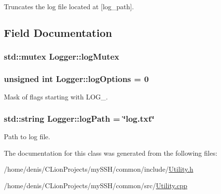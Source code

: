 Truncates the log file located at \mbox{[}log\+\_\+path\mbox{]}. 



\subsection{Field Documentation}
\subsubsection[{\texorpdfstring{log\+Mutex}{logMutex}}]{\setlength{\rightskip}{0pt plus 5cm}std\+::mutex Logger\+::log\+Mutex\hspace{0.3cm}{\ttfamily [static]}}\hypertarget{classLogger_a1a7f5dc4185f8bff7778f1d6aa8525a9}{}\label{classLogger_a1a7f5dc4185f8bff7778f1d6aa8525a9}
\subsubsection[{\texorpdfstring{log\+Options}{logOptions}}]{\setlength{\rightskip}{0pt plus 5cm}unsigned int Logger\+::log\+Options = 0\hspace{0.3cm}{\ttfamily [static]}}\hypertarget{classLogger_a60d0eaf4eece8b505c52c6302048a9c1}{}\label{classLogger_a60d0eaf4eece8b505c52c6302048a9c1}


Mask of flags starting with L\+O\+G\+\_\+. 

\subsubsection[{\texorpdfstring{log\+Path}{logPath}}]{\setlength{\rightskip}{0pt plus 5cm}std\+::string Logger\+::log\+Path = \char`\"{}log.\+txt\char`\"{}\hspace{0.3cm}{\ttfamily [static]}}\hypertarget{classLogger_af2d3e37c3764663b3e103f0fc2003cb6}{}\label{classLogger_af2d3e37c3764663b3e103f0fc2003cb6}


Path to log file. 



The documentation for this class was generated from the following files\+:\begin{DoxyCompactItemize}
\item 
/home/denis/\+C\+Lion\+Projects/my\+S\+S\+H/common/include/\hyperlink{Utility_8h}{Utility.\+h}\item 
/home/denis/\+C\+Lion\+Projects/my\+S\+S\+H/common/src/\hyperlink{Utility_8cpp}{Utility.\+cpp}\end{DoxyCompactItemize}

